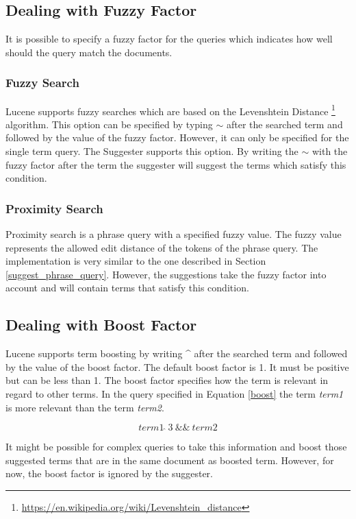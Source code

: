 \subsection{Dealing with Fuzzy Factor}
\label{fuzzy}
It is possible to specify a fuzzy factor for the queries which indicates how well should the query match the documents.

\subsubsection{Fuzzy Search}
Lucene supports fuzzy searches which are based on the Levenshtein Distance
\footnote{\url{https://en.wikipedia.org/wiki/Levenshtein_distance}} algorithm. This option can be specified by typing
$\sim$ after the searched term and followed by the value of the fuzzy factor. However, it can only be specified for the
single term query. The Suggester supports this option. By writing the $\sim$ with the fuzzy factor after the term the
suggester will suggest the terms which satisfy this condition.

\subsubsection{Proximity Search}
Proximity search is a phrase query with a specified fuzzy value. The fuzzy value represents the allowed edit distance of the
tokens of the phrase query. The implementation is very similar to the one described in Section \ref{suggest_phrase_query}. However, the suggestions
take the fuzzy factor into account and will contain terms that satisfy this condition.

\subsection{Dealing with Boost Factor}
Lucene supports term boosting by writing \textbf{\^} after the searched term and followed by the value of the boost factor.
The default boost factor is 1. It must be positive but can be less than 1. The boost factor specifies how the term is relevant
in regard to other terms. In the query specified in Equation \ref{boost} the term \textit{term1} is more relevant than the term \textit{term2}.

\begin{equation}
\label{boost}
term1\ \hat{}\ 3\ \&\&\ term2
\end{equation}

It might be possible for complex queries to take this information and boost those suggested terms that are in the same
document as boosted term. However, for now, the boost factor is ignored by the suggester.

